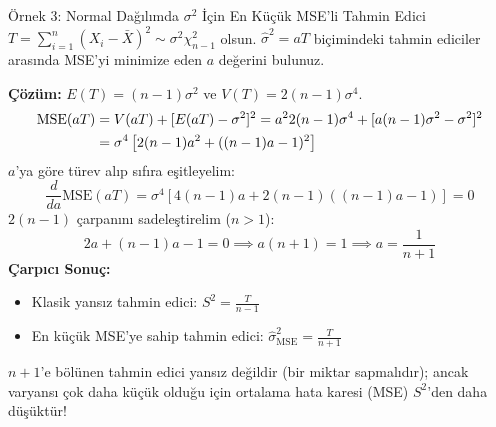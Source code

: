 \documentclass[12pt,a4paper]{article}
\begin{document}
\begin{ornek}{Örnek 3: Normal Dağılımda $\sigma^2$ İçin En Küçük MSE'li Tahmin Edici}
$T = \sum_{i=1}^n (X_i - \bar{X})^2 \sim \sigma^2 \chi^2_{n-1}$ olsun. $\hat{\sigma}^2 = a T$ biçimindeki tahmin ediciler arasında MSE'yi minimize eden $a$ değerini bulunuz.

\bigskip
\textbf{Çözüm:}
$E(T) = (n-1)\sigma^2$ ve $V(T) = 2(n-1)\sigma^4$.
\begin{align}
    \text{MSE}(aT) &= V(aT) + [E(aT) - \sigma^2]^2 = a^2 2(n-1)\sigma^4 + [a(n-1)\sigma^2 - \sigma^2]^2 \notag \\
    &= \sigma^4 \left[ 2(n-1)a^2 + ((n-1)a - 1)^2 \right]
\end{align}
$a$'ya göre türev alıp sıfıra eşitleyelim:
\begin{equation}
    \frac{d}{da} \text{MSE}(aT) = \sigma^4 \left[ 4(n-1)a + 2(n-1)((n-1)a - 1) \right] = 0
\end{equation}
$2(n-1)$ çarpanını sadeleştirelim ($n > 1$):
\begin{equation}
    2a + (n-1)a - 1 = 0 \implies a(n + 1) = 1 \implies \boxed{a = \frac{1}{n+1}}
\end{equation}
\textbf{Çarpıcı Sonuç:}
\begin{itemize}
    \item Klasik yansız tahmin edici: $S^2 = \frac{T}{n-1}$
    \item En küçük MSE'ye sahip tahmin edici: $\hat{\sigma}^2_{\text{MSE}} = \frac{T}{n+1}$
\end{itemize}
$n+1$'e bölünen tahmin edici yansız değildir (bir miktar sapmalıdır); ancak varyansı çok daha küçük olduğu için ortalama hata karesi (MSE) $S^2$'den daha düşüktür!
\end{ornek}

\begin{center}
\end{center}
\end{document}
